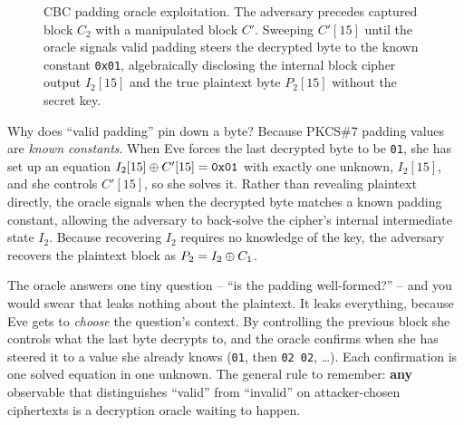\begin{figure}[H]
\caption{CBC padding oracle exploitation. The adversary precedes captured block $C_2$ with a manipulated block $C'$. Sweeping $C'[15]$ until the oracle signals valid padding steers the decrypted byte to the known constant \texttt{0x01}, algebraically disclosing the internal block cipher output $I_2[15]$ and the true plaintext byte $P_2[15]$ without the secret key.}
\label{ch37:fig-cbc-oracle}
\end{figure}

\begin{walkbox}
Why does ``valid padding'' pin down a byte? Because PKCS\#7 padding values are \emph{known constants}. When Eve forces the last decrypted byte to be \texttt{01}, she has set up an equation $I_2[15] \oplus C'[15] = \texttt{0x01}$ with exactly one unknown, $I_2[15]$, and she controls $C'[15]$, so she solves it. Rather than revealing plaintext directly, the oracle signals when the decrypted byte matches a known padding constant, allowing the adversary to back-solve the cipher's internal intermediate state $I_2$. Because recovering $I_2$ requires no knowledge of the key, the adversary recovers the plaintext block as $P_2 = I_2 \oplus C_1$.
\end{walkbox}

\begin{intuitionbox}
The oracle answers one tiny question -- ``is the padding well-formed?'' -- and you would swear that leaks nothing about the plaintext. It leaks everything, because Eve gets to \emph{choose} the question's context. By controlling the previous block she controls what the last byte decrypts to, and the oracle confirms when she has steered it to a value she already knows (\texttt{01}, then \texttt{02 02}, \ldots). Each confirmation is one solved equation in one unknown. The general rule to remember: \textbf{any} observable that distinguishes ``valid'' from ``invalid'' on attacker-chosen ciphertexts is a decryption oracle waiting to happen.
\end{intuitionbox}

